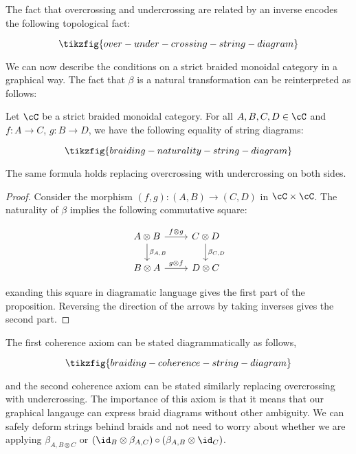 \begin{rem}
The fact that overcrossing and undercrossing are related by an inverse encodes the following topological fact:

\begin{equation*}
\tikzfig{over-under-crossing-string-diagram}
\end{equation*}
\end{rem}

We can now describe the conditions on a strict braided monoidal category in a graphical way. The fact that $\beta$ is a natural transformation can be reinterpreted as follows:

\begin{lem} Let $\cC$ be a strict braided monoidal category. For all $A,B,C,D\in \cC$ and $f:A\to C$, $g:B\to D$, we have the following equality of string diagrams:

\begin{equation*}
\tikzfig{braiding-naturality-string-diagram}
\end{equation*}

The same formula holds replacing overcrossing with undercrossing on both sides.
\end{lem}
\begin{proof} Consider the morphism $(f,g):(A,B)\xrightarrow{}(C,D)$ in $\cC\times \cC$. The naturality of $\beta$ implies the following commutative square:


\[\begin{tikzcd}
	{A\otimes B} & {C\otimes D} \\
	{B\otimes A} & {D\otimes C}
	\arrow["{f\otimes g}", from=1-1, to=1-2]
	\arrow["{\beta_{A,B}}", from=1-1, to=2-1]
	\arrow["{\beta_{C,D}}", from=1-2, to=2-2]
	\arrow["{g\otimes f}", from=2-1, to=2-2]
\end{tikzcd}\]

exanding this square in diagramatic language gives the first part of the proposition. Reversing the direction of the arrows by taking inverses gives the second part.
\end{proof}

\begin{rem}
The first coherence axiom can be stated diagrammatically as follows,

\begin{equation*}
\tikzfig{braiding-coherence-string-diagram}
\end{equation*}

and the second coherence axiom can be stated similarly replacing overcrossing with undercrossing. The importance of this axiom is that it means that our graphical langauge can express braid diagrams without other ambiguity. We can safely deform strings behind braids and not need to worry about whether we are applying $\beta_{A,B\otimes C}$ or $(\id_{B}\otimes \beta_{A,C})\circ (\beta_{A,B}\otimes \id_{C})$.
\end{rem}

